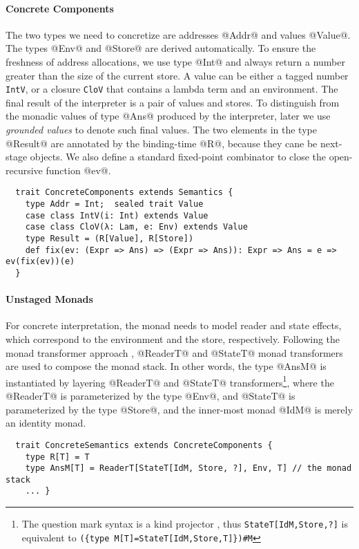 \paragraph{Concrete Components}
The two types we need to concretize are addresses @Addr@ and values @Value@. The
types @Env@ and @Store@ are derived automatically. To ensure the freshness of
address allocations, we use type @Int@ and always return a number greater
than the size of the current store.
A value can be either a tagged number \texttt{IntV}, or a closure
\texttt{CloV} that contains a lambda term and an environment. The final
result of the interpreter is a pair of values and stores.
To distinguish from the monadic values of type @Ans@ produced by the
interpreter, later we use \textit{grounded values} to denote such final values.
The two elements in the type @Result@ are annotated by the binding-time @R@,
because they cane be next-stage objects.  We also define a standard fixed-point
combinator to close the open-recursive function @ev@.
\begin{lstlisting}
  trait ConcreteComponents extends Semantics {
    type Addr = Int;  sealed trait Value
    case class IntV(i: Int) extends Value
    case class CloV(λ: Lam, e: Env) extends Value
    type Result = (R[Value], R[Store])
    def fix(ev: (Expr => Ans) => (Expr => Ans)): Expr => Ans = e => ev(fix(ev))(e)
  }
\end{lstlisting}

\paragraph{Unstaged Monads}
For concrete interpretation, the monad needs to model reader and state
effects, which correspond to the environment and the store, respectively. Following
the monad transformer approach \cite{DBLP:conf/popl/LiangHJ95}, @ReaderT@ and
@StateT@ monad transformers are used to compose the monad stack. In other words,
the type @AnsM@ is instantiated by layering @ReaderT@ and @StateT@
transformers\footnote{The question mark syntax is a kind projector
\cite{kindprojector}, thus \texttt{StateT[IdM,Store,?]} is equivalent to
\newline \texttt{(\{type M[T]=StateT[IdM,Store,T]\})\#M}}, where the @ReaderT@
is parameterized by the type @Env@, and @StateT@ is parameterized by the type @Store@,
and the inner-most monad @IdM@ is merely an identity monad.
\begin{lstlisting}
  trait ConcreteSemantics extends ConcreteComponents {
    type R[T] = T
    type AnsM[T] = ReaderT[StateT[IdM, Store, ?], Env, T] // the monad stack
    ... }
\end{lstlisting}

